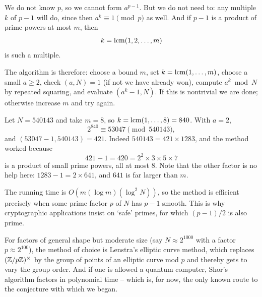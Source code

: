 \documentclass[a4paper]{scrartcl}
\begin{document}
We do not know $p$, so we cannot form $a^{p-1}$. But we do not need to: any multiple $k$ of $p - 1$ will do, since then $a^k \equiv 1 \pmod p$ as well. And if $p - 1$ is a product of prime powers at most $m$, then
$$
k = \operatorname{lcm}(1, 2, \dots, m)
$$
is such a multiple.

The algorithm is therefore: choose a bound $m$, set $k = \operatorname{lcm}(1,\dots,m)$, choose a small $a \geq 2$, check $(a, N) = 1$ (if not we have already won), compute $a^k \bmod N$ by repeated squaring, and evaluate $(a^k - 1, N)$. If this is nontrivial we are done; otherwise increase $m$ and try again.

\begin{example}
	Let $N = 540143$ and take $m = 8$, so $k = \operatorname{lcm}(1,\dots,8) = 840$. With $a = 2$,
	$$
	2^{840} \equiv 53047 \pmod{540143},
	$$
	and $(53047 - 1, 540143) = 421$. Indeed $540143 = 421\times1283$, and the method worked because
	$$
	421 - 1 = 420 = 2^2\times3\times5\times7
	$$
	is a product of small prime powers, all at most $8$. Note that the other factor is no help here: $1283 - 1 = 2\times641$, and $641$ is far larger than $m$.
\end{example}

\begin{remark}
	The running time is $O(m(\log m)(\log^2N))$, so the method is efficient precisely when some prime factor $p$ of $N$ has $p - 1$ smooth. This is why cryptographic applications insist on `safe' primes, for which $(p-1)/2$ is also prime.

	For factors of general shape but moderate size (say $N \approx 2^{1000}$ with a factor $p \approx 2^{100}$), the method of choice is Lenstra's elliptic curve method, which replaces $(\mathbb{Z}/p\mathbb{Z})^\times$ by the group of points of an elliptic curve mod $p$ and thereby gets to vary the group order. And if one is allowed a quantum computer, Shor's algorithm factors in polynomial time -- which is, for now, the only known route to the conjecture with which we began.
\end{remark}
\end{document}
